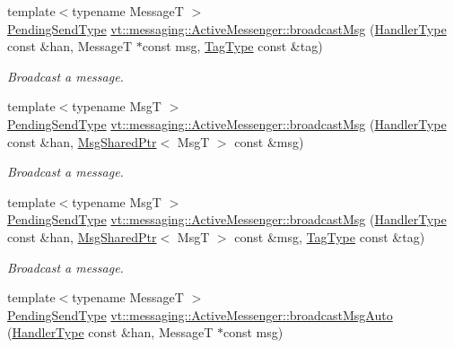 \begin{DoxyCompactItemize}
{\footnotesize template$<$typename MessageT $>$ }\\\hyperlink{structvt_1_1messaging_1_1_active_messenger_a3626a6ca76d8ad4ec7c3b47a2c70d3a8}{Pending\+Send\+Type} \hyperlink{group__preregister_gae6b4f2036fb32acb6a62fc77954ca06f}{vt\+::messaging\+::\+Active\+Messenger\+::broadcast\+Msg} (\hyperlink{namespacevt_af64846b57dfcaf104da3ef6967917573}{Handler\+Type} const \&han, MessageT $\ast$const msg, \hyperlink{namespacevt_a84ab281dae04a52a4b243d6bf62d0e52}{Tag\+Type} const \&tag)
\begin{DoxyCompactList}\small\item\em Broadcast a message. \end{DoxyCompactList}\item 
{\footnotesize template$<$typename MsgT $>$ }\\\hyperlink{structvt_1_1messaging_1_1_active_messenger_a3626a6ca76d8ad4ec7c3b47a2c70d3a8}{Pending\+Send\+Type} \hyperlink{group__preregister_gae5a1d5306f276d9a3db69c84ef089a88}{vt\+::messaging\+::\+Active\+Messenger\+::broadcast\+Msg} (\hyperlink{namespacevt_af64846b57dfcaf104da3ef6967917573}{Handler\+Type} const \&han, \hyperlink{structvt_1_1messaging_1_1_msg_shared_ptr}{Msg\+Shared\+Ptr}$<$ MsgT $>$ const \&msg)
\begin{DoxyCompactList}\small\item\em Broadcast a message. \end{DoxyCompactList}\item 
{\footnotesize template$<$typename MsgT $>$ }\\\hyperlink{structvt_1_1messaging_1_1_active_messenger_a3626a6ca76d8ad4ec7c3b47a2c70d3a8}{Pending\+Send\+Type} \hyperlink{group__preregister_ga5ac8b6da1678b07b521060cdc52b0101}{vt\+::messaging\+::\+Active\+Messenger\+::broadcast\+Msg} (\hyperlink{namespacevt_af64846b57dfcaf104da3ef6967917573}{Handler\+Type} const \&han, \hyperlink{structvt_1_1messaging_1_1_msg_shared_ptr}{Msg\+Shared\+Ptr}$<$ MsgT $>$ const \&msg, \hyperlink{namespacevt_a84ab281dae04a52a4b243d6bf62d0e52}{Tag\+Type} const \&tag)
\begin{DoxyCompactList}\small\item\em Broadcast a message. \end{DoxyCompactList}\item 
{\footnotesize template$<$typename MessageT $>$ }\\\hyperlink{structvt_1_1messaging_1_1_active_messenger_a3626a6ca76d8ad4ec7c3b47a2c70d3a8}{Pending\+Send\+Type} \hyperlink{group__preregister_ga9dc42ebe9b72717dbc7d63733aa832ff}{vt\+::messaging\+::\+Active\+Messenger\+::broadcast\+Msg\+Auto} (\hyperlink{namespacevt_af64846b57dfcaf104da3ef6967917573}{Handler\+Type} const \&han, MessageT $\ast$const msg)

\end{DoxyCompactItemize}
